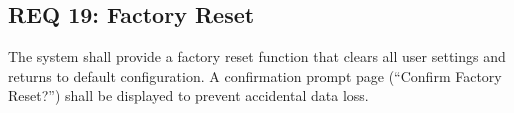 \subsection*{REQ 19: Factory Reset}
\label{subsec:REQ 19: Factory Reset}
The system shall provide a factory reset function that clears all user settings and returns to default configuration. A confirmation prompt page (``Confirm Factory Reset?'') shall be displayed to prevent accidental data loss.





